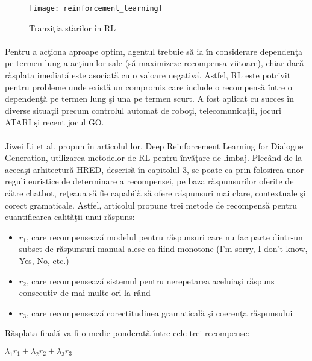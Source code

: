 \begin{figure}[H]
\centering
\texttt{[image: reinforcement\_learning]}
\caption{Tranzi\c tia st\u arilor \^ in RL}
\end{figure}

\paragraph{}
Pentru a ac\c tiona aproape optim, agentul trebuie s\u a ia \^ in considerare dependen\c ta pe termen lung a ac\c tiunilor sale (s\u a maximizeze recompensa viitoare), chiar dac\u a r\u asplata imediat\u a este asociat\u a cu o valoare negativ\u a. Astfel, RL este potrivit pentru probleme unde exist\u a un compromis care include o recompens\u a \^ intre o dependen\c t\u a pe termen lung \c si una pe termen scurt. A fost aplicat cu succes \^ in diverse situa\c tii precum controlul automat de robo\c ti, telecomunica\c tii, jocuri ATARI \c si recent jocul GO.

\paragraph{}
Jiwei Li et al. propun \^ in articolul lor, Deep Reinforcement Learning for Dialogue Generation, utilizarea metodelor de RL pentru \^ inv\u a\c tare de limbaj. Plec\^ and de la aceea\c si arhitectur\u a HRED, descris\u a \^ in capitolul 3, se poate ca prin folosirea unor reguli euristice de determinare a recompensei, pe baza r\u aspunsurilor oferite de c\u atre chatbot, re\c teaua s\u a fie capabil\u a s\u a ofere r\u aspunsuri mai clare, contextuale \c si corect gramaticale. Astfel, articolul propune trei metode de recompens\u a pentru cuantificarea calit\u a\c tii unui r\u aspuns:

\begin{itemize}
	\item \(r_1\), care recompenseaz\u a modelul pentru r\u aspunsuri care nu fac parte dintr-un subset de r\u aspunsuri manual alese ca fiind monotone (I'm sorry, I don't know, Yes, No, etc.)
	\item \(r_2\), care recompenseaz\u a sistemul pentru nerepetarea aceluia\c si r\u aspuns consecutiv de mai multe ori la r\^ and
	\item \(r_3\), care recompenseaz\u a corectitudinea gramatical\u a \c si coeren\c ta r\u aspunsului
\end{itemize}


R\u asplata final\u a va fi o medie ponderat\u a \^ intre cele trei recompense:
\begin{center}
\(\lambda_1 r_1 + \lambda_2 r_2 + \lambda_3 r_3\)
\end{center}

